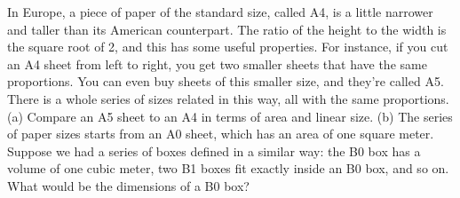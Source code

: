  In Europe, a piece of paper of the standard size,
called A4, is a little narrower and taller than its American
counterpart. The ratio of the height to the width is the
square root of 2, and this has some useful properties. For
instance, if you cut an A4 sheet from left to right, you get
two smaller sheets that have the same proportions. You can
even buy sheets of this smaller size, and they're called A5.
There is a whole series of sizes related in this way, all
with the same proportions. (a) Compare an A5 sheet to an A4
in terms of area and linear size. (b) The series of paper
sizes starts from an A0 sheet, which has an area of one
square meter. Suppose we had a series of boxes defined in a
similar way: the B0 box has a volume of one cubic meter, two
B1 boxes fit exactly inside an B0 box, and so on. What would
be the dimensions of a B0 box? \answercheck
